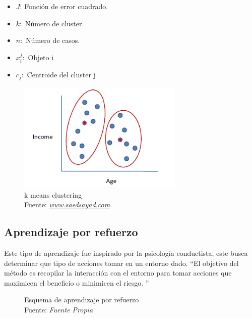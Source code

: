 \begin{itemize}
	\item $J$: Función de error cuadrado.
	\item $k:$ Número de cluster.
	\item $n:$ Número de casos.
	\item $x_{i}^j:$ Objeto i
	\item $c_{j}:$ Centroide del cluster j
\end{itemize}
\begin{figure}[H]
	\centering
	\includegraphics[width=0.7\textwidth]{Figures/kmeans.png}
	\caption{k means clustering\\ Fuente:  \href{http://www.saedsayad.com/clustering_kmeans.htm}{\textit{www.saedsayad.com}}}
	\label{kmeans}
\end{figure} 


\subsection{Aprendizaje por refuerzo}
Este tipo de aprendizaje fue inspirado por la psicología conductista, este busca determinar que tipo de acciones tomar en un entorno dado. \textquotedblleft El objetivo del método es recopilar la interacción con el entorno para tomar acciones que maximicen el beneficio o minimicen el riesgo. \textquotedblright \cite{WEBSITE:1}

\begin{figure}[H]
\begin{center}
	
\end{center}
\caption{Esquema de aprendizaje por refuerzo \\ Fuente:  \textit{Fuente Propia}}
\label{refuerzo}
\end{figure}

